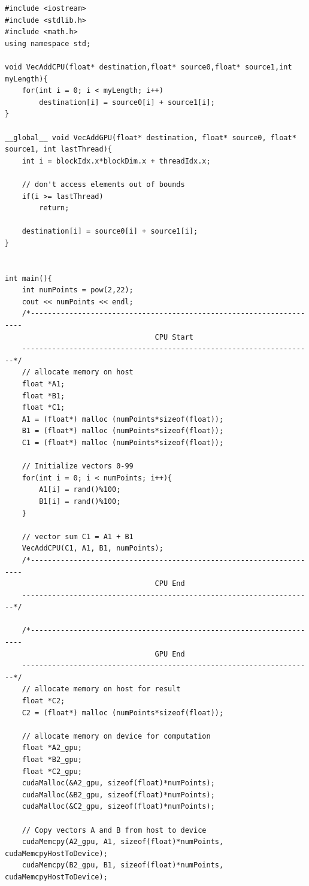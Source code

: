 \singlespacing
\clearpage
\begin{lstlisting}[style=myCUDAstyle,caption={Comparison of CPU verse GPU code.},label={code:GPUvsCPU}]
#include <iostream>
#include <stdlib.h>
#include <math.h>
using namespace std;

void VecAddCPU(float* destination,float* source0,float* source1,int myLength){
	for(int i = 0; i < myLength; i++)
		destination[i] = source0[i] + source1[i];
}

__global__ void VecAddGPU(float* destination, float* source0, float* source1, int lastThread){
	int i = blockIdx.x*blockDim.x + threadIdx.x;

	// don't access elements out of bounds
	if(i >= lastThread)
		return;

	destination[i] = source0[i] + source1[i];
}


int main(){
	int numPoints = pow(2,22);
	cout << numPoints << endl;
	/*--------------------------------------------------------------------
                               	   CPU Start
	--------------------------------------------------------------------*/
	// allocate memory on host
	float *A1;
	float *B1;
	float *C1;
	A1 = (float*) malloc (numPoints*sizeof(float));
	B1 = (float*) malloc (numPoints*sizeof(float));
	C1 = (float*) malloc (numPoints*sizeof(float));

	// Initialize vectors 0-99
	for(int i = 0; i < numPoints; i++){
		A1[i] = rand()%100;
		B1[i] = rand()%100;
	}

	// vector sum C1 = A1 + B1
	VecAddCPU(C1, A1, B1, numPoints);
	/*--------------------------------------------------------------------
                               	   CPU End
	--------------------------------------------------------------------*/

	/*--------------------------------------------------------------------
                               	   GPU End
	--------------------------------------------------------------------*/
	// allocate memory on host for result
	float *C2;
	C2 = (float*) malloc (numPoints*sizeof(float));

	// allocate memory on device for computation
	float *A2_gpu;
	float *B2_gpu;
	float *C2_gpu;
	cudaMalloc(&A2_gpu, sizeof(float)*numPoints);
	cudaMalloc(&B2_gpu, sizeof(float)*numPoints);
	cudaMalloc(&C2_gpu, sizeof(float)*numPoints);

	// Copy vectors A and B from host to device
	cudaMemcpy(A2_gpu, A1, sizeof(float)*numPoints, cudaMemcpyHostToDevice);
	cudaMemcpy(B2_gpu, B1, sizeof(float)*numPoints, cudaMemcpyHostToDevice);


\end{lstlisting}

